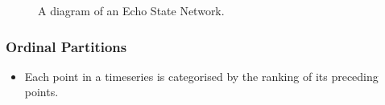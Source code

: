 \documentclass{beamer}
\begin{document}
\begin{frame}
\begin{figure}
        \caption{A diagram of an Echo State Network.}
        \label{fig:ESN}
    \end{figure}
\end{frame}

\begin{frame}
    \frametitle{Ordinal Partitions}

    \begin{itemize}
        \item Each point in a timeseries is categorised by the ranking of its preceding points.
    \end{itemize}
    

\end{frame}
\end{document}
